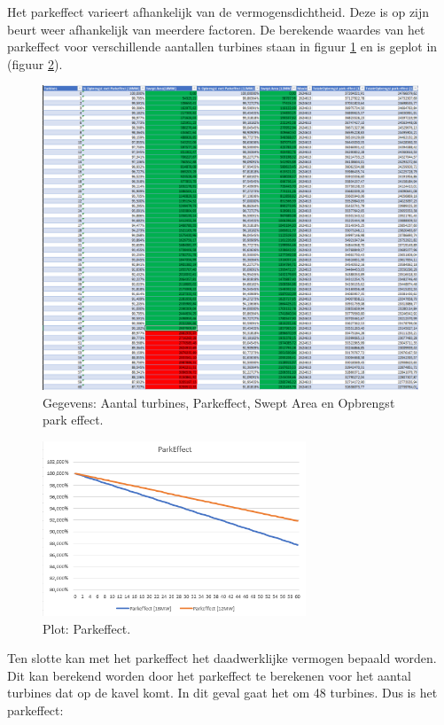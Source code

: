 Het parkeffect varieert afhankelijk van de vermogensdichtheid. Deze is op zijn beurt weer afhankelijk van meerdere factoren. De berekende waardes van het parkeffect voor verschillende aantallen turbines staan in figuur \ref{fig:Parkeffect_table} en is geplot in (figuur \ref{fig:ParkEffectGraph}). 

\begin{figure}[H]
\centering
\includegraphics[width=1\textwidth]{IMG/data/overzicht/swept_area.PNG}
\caption{Gegevens: Aantal turbines, Parkeffect, Swept Area en Opbrengst park effect.}
\label{fig:Parkeffect_table}
\end{figure}

\begin{figure}[H]
\centering
\includegraphics[width=0.7\textwidth]{IMG/data/overzicht/parkeffect_graph.PNG}
\caption{Plot: Parkeffect.}
\label{fig:ParkEffectGraph}
\end{figure}

Ten slotte kan met het parkeffect het daadwerklijke vermogen bepaald worden. Dit kan berekend worden door het parkeffect te berekenen voor het aantal turbines dat op de kavel komt. In dit geval gaat het om 48 turbines. Dus is het parkeffect: 

